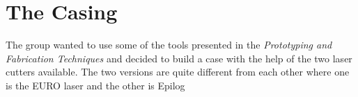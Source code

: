 \chapter{The Casing}
\label{the_casing}
The group wanted to use some of the tools presented in the \textit{Prototyping and Fabrication Techniques} and decided to build a case with the help of the two laser cutters available. The two versions are quite different from each other where one is the EURO laser and the other is Epilog 